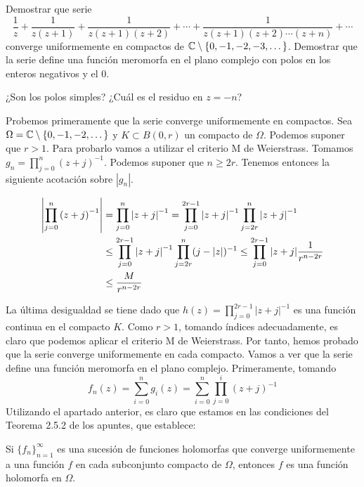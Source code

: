 \documentclass[twoside]{article}
\begin{document}
\newpage
\begin{ejercicio}{1}
Demostrar que serie 
$$
\frac{1}{z}+\frac{1}{z(z+1)}+\frac{1}{z(z+1)(z+2)}+\cdots + \frac{1}{z(z+1)(z+2)\cdots  (z+n)}+\cdots$$
converge uniformemente en compactos de $\mathbb{C}\setminus\{0,-1,-2,-3,\dotsc\}$. Demostrar que la serie define una función meromorfa en el plano complejo con polos en los enteros negativos y el $0$.

¿Son los polos simples? ¿Cuál es el residuo en $z=-n$?
\begin{solucion}
Probemos primeramente que la serie converge uniformemente en compactos. Sea $\Omega = \mathbb{C}\setminus\{0,-1,-2,\dotsc\}$ y $K\subset B(0,r)$ un compacto de $\Omega$. Podemos suponer que $r>1$. Para probarlo vamos a utilizar el criterio M de Weierstrass. Tomamos $g_n = \prod_{j=0}^n \left(z+j\right)^{-1}$. Podemos suponer que $n\geq 2r$.  Tenemos entonces la siguiente acotación sobre $|g_n|$.

\begin{align*}
\left\lvert\prod_{j=0}^n \left(z+j\right)^{-1}\right\rvert &= \prod_{j=0}^n \left|z+j\right|^{-1} =  \prod_{j=0}^{2r-1}\left|z+j\right|^{-1}  \prod_{j=2r}^n \left|z+j\right|^{-1}\\
&\leq  \prod_{j=0}^{2r-1}\left|z+j\right|^{-1}  \prod_{j=2r}^n (j-|z|)^{-1} \leq \prod_{j=0}^{2r-1}|z+j|\frac{1}{r^{n-2r}}\\
& \leq \frac{M}{r^{n-2r}}
\end{align*}

La última desigualdad se tiene dado que $h(z)=\prod_{j=0}^{2r-1}|z+j|^{-1}$ es una función continua en el compacto $K$. Como $r>1$, tomando índices adecuadamente, es claro que podemos aplicar el criterio M de Weierstrass. Por tanto, hemos probado que la serie converge uniformemente en cada compacto.
\newpage
Vamos a ver que la serie define una función meromorfa en el plano complejo. Primeramente, tomando 
$$
 f_n(z) = \sum_{i=0}^n g_i(z) = \sum_{i=0}^n \prod_{j=0}^i (z+j)^{-1}
$$
Utilizando el apartado anterior, es claro que estamos en las condiciones del Teorema 2.5.2 de los apuntes, que establece:

\begin{theorem}
Si $\{f_n\}_{n=1}^\infty$ es una sucesión de funciones holomorfas que converge uniformemente a una función $f$ en cada subconjunto compacto de $\Omega$, entonces $f$ es una función holomorfa en $\Omega$.
\end{theorem}


\end{solucion}
\end{ejercicio}
\end{document}
